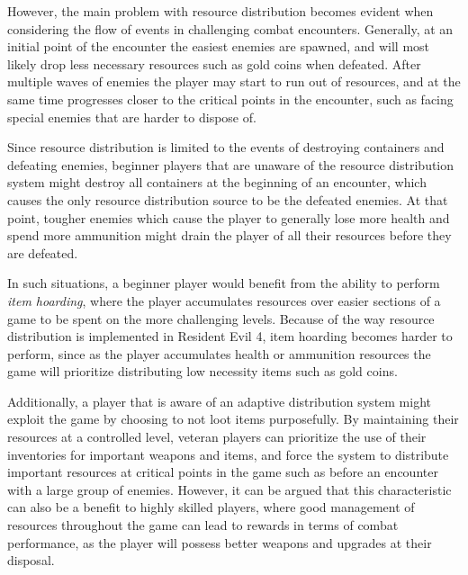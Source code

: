 However, the main problem with resource distribution becomes evident when considering the flow of events in challenging combat encounters. Generally, at an initial point of the encounter the easiest enemies are spawned, and will most likely drop less necessary resources such as gold coins when defeated. After multiple waves of enemies the player may start to run out of resources, and at the same time progresses closer to the critical points in the encounter, such as facing special enemies that are harder to dispose of.

Since resource distribution is limited to the events of destroying containers and defeating enemies, beginner players that are unaware of the resource distribution system might destroy all containers at the beginning of an encounter, which causes the only resource distribution source to be the defeated enemies. At that point, tougher enemies which cause the player to generally lose more health and spend more ammunition might drain the player of all their resources before they are defeated.

In such situations, a beginner player would benefit from the ability to perform \emph{item hoarding}, where the player accumulates resources over easier sections of a game to be spent on the more challenging levels. Because of the way resource distribution is implemented in Resident Evil 4, item hoarding becomes harder to perform, since as the player accumulates health or ammunition resources the game will prioritize distributing low necessity items such as gold coins.

Additionally, a player that is aware of an adaptive distribution system might exploit the game by choosing to not loot items purposefully. By maintaining their resources at a controlled level, veteran players can prioritize the use of their inventories for important weapons and items, and force the system to distribute important resources at critical points in the game such as before an encounter with a large group of enemies. However, it can be argued that this characteristic can also be a benefit to highly skilled players, where good management of resources throughout the game can lead to rewards in terms of combat performance, as the player will possess better weapons and upgrades at their disposal.

